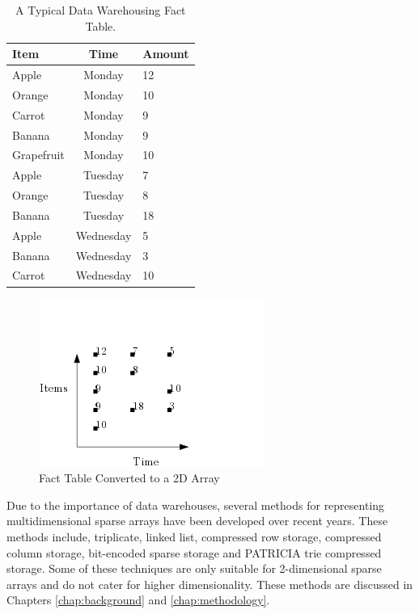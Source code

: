 \begin{table}[H]
	\caption{A Typical Data Warehousing Fact Table.\label{tab:example}}
	\begin{center}
		\begin{tabular}{p{26mm}cp{35mm}}
			\hline
			{\textbf{Item}} & {\textbf{Time}} & {\textbf{ Amount}}\\
			\hline
			Apple   & Monday & 12 \\
			Orange  & Monday & 10\\
			Carrot  & Monday & 9\\
			Banana  & Monday & 9\\
			Grapefruit & Monday & 10\\
			Apple   & Tuesday & 7 \\
			Orange  & Tuesday & 8 \\
			Banana	& Tuesday & 18 \\
			Apple   & Wednesday & 5 \\
			Banana  & Wednesday & 3\\
			Carrot  & Wednesday & 10\\
			\hline
		\end{tabular}
	\end{center}
\end{table}

 \begin{figure}[H]
	\centering
	\includegraphics[width=0.6\linewidth]{exampleDataWarehouse}
	\caption{Fact Table Converted to a 2D Array}
	\label{fig:exampleDataWarehousing}
\end{figure}

Due to the importance of data warehouses, several methods for representing multidimensional sparse arrays have been developed over recent years. These methods include, triplicate, linked list, compressed row storage, compressed column storage, bit-encoded sparse storage and PATRICIA trie compressed storage. Some of these techniques are only suitable for 2-dimensional sparse arrays and do not cater for higher dimensionality. These methods are discussed in Chapters \ref{chap:background} and \ref{chap:methodology}. 

